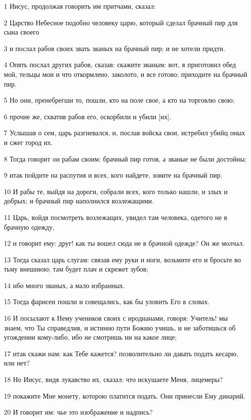 \par 1 Иисус, продолжая говорить им притчами, сказал:
\par 2 Царство Небесное подобно человеку царю, который сделал брачный пир для сына своего
\par 3 и послал рабов своих звать званых на брачный пир; и не хотели придти.
\par 4 Опять послал других рабов, сказав: скажите званым: вот, я приготовил обед мой, тельцы мои и что откормлено, заколото, и все готово; приходите на брачный пир.
\par 5 Но они, пренебрегши то, пошли, кто на поле свое, а кто на торговлю свою;
\par 6 прочие же, схватив рабов его, оскорбили и убили [их].
\par 7 Услышав о сем, царь разгневался, и, послав войска свои, истребил убийц оных и сжег город их.
\par 8 Тогда говорит он рабам своим: брачный пир готов, а званые не были достойны;
\par 9 итак пойдите на распутия и всех, кого найдете, зовите на брачный пир.
\par 10 И рабы те, выйдя на дороги, собрали всех, кого только нашли, и злых и добрых; и брачный пир наполнился возлежащими.
\par 11 Царь, войдя посмотреть возлежащих, увидел там человека, одетого не в брачную одежду,
\par 12 и говорит ему: друг! как ты вошел сюда не в брачной одежде? Он же молчал.
\par 13 Тогда сказал царь слугам: связав ему руки и ноги, возьмите его и бросьте во тьму внешнюю; там будет плач и скрежет зубов;
\par 14 ибо много званых, а мало избранных.
\par 15 Тогда фарисеи пошли и совещались, как бы уловить Его в словах.
\par 16 И посылают к Нему учеников своих с иродианами, говоря: Учитель! мы знаем, что Ты справедлив, и истинно пути Божию учишь, и не заботишься об угождении кому-либо, ибо не смотришь ни на какое лице;
\par 17 итак скажи нам: как Тебе кажется? позволительно ли давать подать кесарю, или нет?
\par 18 Но Иисус, видя лукавство их, сказал: что искушаете Меня, лицемеры?
\par 19 покажите Мне монету, которою платится подать. Они принесли Ему динарий.
\par 20 И говорит им: чье это изображение и надпись?
